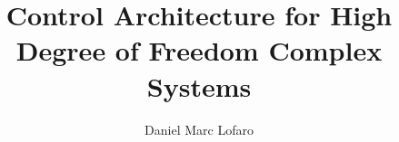 \documentclass[12pt, letterpaper]{drexelthesis}
\author{Daniel Marc Lofaro}
\title{Control Architecture for High Degree of Freedom Complex Systems}
\begin{document}
 



	\doublespacing
	\maketitle 
\begin{preliminary}
	\sloppy
	\copyrightpage
	
	
	
	
	
	
	\mytableofcontents
	\mylistoftables
	\mylistoffigures
\end{preliminary}

\begin{thesis}
	\fussy
	
	
	
	
	
	

	\singlespacing
%	
%	
	
	
%	

	\appendix
	
        
\end{thesis}
\end{document}
